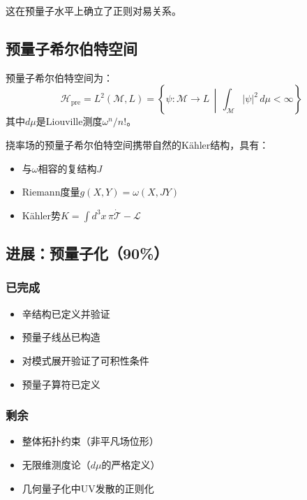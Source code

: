 这在预量子水平上确立了正则对易关系。

\subsection{预量子希尔伯特空间}

\begin{definition}[预量子希尔伯特空间]
预量子希尔伯特空间为：
\begin{equation}
    \mathcal{H}_{\text{pre}} = L^2(\mathcal{M}, L) = \left\{ \psi : \mathcal{M} \to L \, \middle| \, \int_{\mathcal{M}} |\psi|^2 \, d\mu < \infty \right\}
\end{equation}
其中$d\mu$是Liouville测度$\omega^n/n!$。
\end{definition}

\begin{theorem}[Kähler结构]
挠率场的预量子希尔伯特空间携带自然的Kähler结构，具有：
\begin{itemize}
    \item 与$\omega$相容的复结构$J$
    \item Riemann度量$g(X, Y) = \omega(X, JY)$
    \item Kähler势$K = \int d^3x \, \pi \dot{\mathcal{T}} - \mathcal{L}$
\end{itemize}
\end{theorem}

\subsection{进展：预量子化（90\%）}

\subsubsection{已完成}
\begin{itemize}
    \item 辛结构已定义并验证
    \item 预量子线丛已构造
    \item 对模式展开验证了可积性条件
    \item 预量子算符已定义
\end{itemize}

\subsubsection{剩余}
\begin{itemize}
    \item 整体拓扑约束（非平凡场位形）
    \item 无限维测度论（$d\mu$的严格定义）
    \item 几何量子化中UV发散的正则化
\end{itemize}

